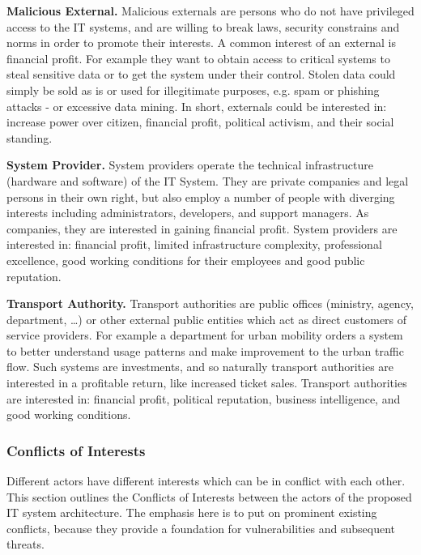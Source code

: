 \documentclass[runningheads,a4paper]{llncs}
\begin{document}
\textbf{Malicious External.}
Malicious externals are persons who do not have privileged access to the IT systems, and are willing to break laws, security constrains and norms in order to promote their interests. A common interest of an external is financial profit. For example they want to obtain access to critical systems to steal sensitive data or to get the system under their control. Stolen data could simply be sold as is or used for illegitimate purposes, e.g. spam or phishing attacks - or excessive data mining. In short, externals could be interested in: increase power over citizen, financial profit, political activism, and their social standing.

\textbf{System Provider.}
System providers operate the technical infrastructure (hardware and software) of the IT System. They are private companies and legal persons in their own right, but also employ a number of people with diverging interests including administrators, developers, and support managers. As companies, they are interested in gaining financial profit. 
System providers are interested in: financial profit, limited infrastructure complexity, professional excellence, good working conditions for their employees and good public reputation.

\textbf{Transport Authority.}
Transport authorities are public offices (ministry, agency, department, \dots) or other external public entities which act as direct customers of service providers. For example a department for urban mobility orders a system to better understand usage patterns and make improvement to the urban traffic flow. Such systems are investments, and so naturally transport authorities are interested in a profitable return, like increased ticket sales. Transport authorities are interested in: financial profit, political reputation, business intelligence, and good working conditions.


\subsubsection{Conflicts of Interests}
\label{subsubsection:Conflicts of Interests}
Different actors have different interests which can be in conflict with each other. This section outlines the Conflicts of Interests between the actors of the proposed IT system architecture. The emphasis here is to put on prominent existing conflicts, because they provide a foundation for vulnerabilities and subsequent threats.
\end{document}
